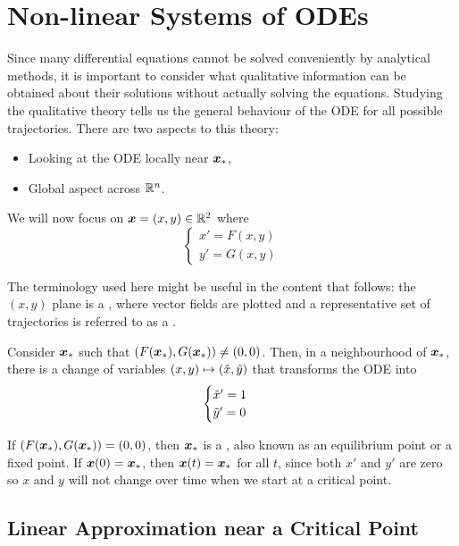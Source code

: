 \section{Non-linear Systems of ODEs}

Since many differential equations cannot be solved conveniently by analytical methods, it is important to consider what qualitative information can be obtained about their solutions without actually solving the equations. Studying the qualitative theory tells us the general behaviour of the ODE for all possible trajectories. There are two aspects to this theory:
\begin{itemize}
	\item Looking at the ODE locally near $\bm{x}_{\ast}$,
	\item Global aspect across $\mathbb{R}^n$.
\end{itemize}

We will now focus on $\bm{x} = (x, y) \in \mathbb{R}^2$ where 
\begin{equation}\label{eq:linearsystem2}
	\begin{cases}
		x' = F(x,y) \\
		y' = G(x,y)
	\end{cases}
\end{equation}

The terminology used here might be useful in the content that follows: the $(x,y)$ plane is a , where vector fields are plotted and a representative set of trajectories is referred to as a .

\begin{theorem}
	Consider $\bm{x}_{\ast}$ such that $(F(\bm{x}_{\ast}), G(\bm{x}_{\ast})) \neq (0,0)$. Then, in a neighbourhood of $\bm{x}_{\ast}$, there is a change of variables $(x,y) \mapsto (\Tilde{x}, \Tilde{y})$ that transforms the ODE into 
	\[
	\begin{cases}
		\Tilde{x}' = 1 \\
		\Tilde{y}' = 0
	\end{cases}
	\]
\end{theorem}

If $(F(\bm{x}_{\ast}), G(\bm{x}_{\ast})) = (0,0)$, then $\bm{x}_{\ast}$ is a , also known as an equilibrium point or a fixed point. If $\bm{x}(0) = \bm{x}_{\ast}$, then $\bm{x}(t) = \bm{x}_{\ast}$ for all $t$, since both $x'$ and $y'$ are zero so $x$ and $y$ will not change over time when we start at a critical point.

\subsection{Linear Approximation near a Critical Point}\label{sec:linearapproxcp}

